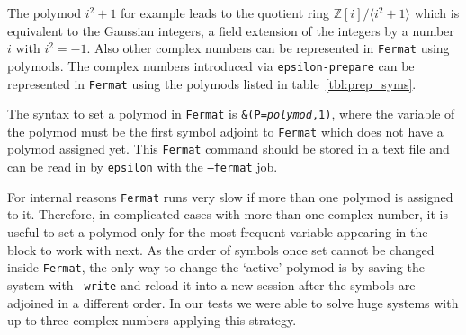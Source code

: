 \documentclass[12pt]{article}
\numberwithin{equation}{section}
\numberwithin{figure}{section}
\begin{document}
        The polymod $i^2 + 1$ for example leads to the quotient ring $\mathds{Z}[i]/\langle i^2 + 1\rangle$ which is equivalent to the Gaussian integers, a field extension of the integers by a number $i$ with $i^2 = -1$.
        Also other complex numbers can be represented in \texttt{Fermat} using polymods.
        The complex numbers introduced via \texttt{epsilon-prepare} can be represented in \texttt{Fermat} using the polymods listed in table~\ref{tbl:prep_syms}.
       
        The syntax to set a polymod in \texttt{Fermat} is \texttt{\&(P=\textit{polymod},1)}, where the variable of the polymod must be the first symbol adjoint to \texttt{Fermat} which does not have a polymod assigned yet.
        This \texttt{Fermat} command should be stored in a text file and can be read in by \texttt{epsilon} with the \texttt{--fermat} job.

        For internal reasons \texttt{Fermat} runs very slow if more than one polymod is assigned to it.
        Therefore, in complicated cases with more than one complex number, it is useful to set a polymod only for the most frequent variable appearing in the block to work with next.
        As the order of symbols once set cannot be changed inside \texttt{Fermat}, the only way to change the `active' polymod is by saving the system with \texttt{--write} and reload it into a new session after the symbols are adjoined in a different order.
        In our tests we were able to solve huge systems with up to three complex numbers applying this strategy.
\end{document}
